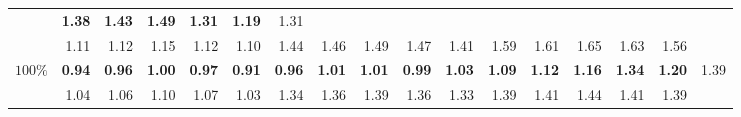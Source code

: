 \begin{table}
\begin{tabular}{|r|rrrrr|rrrrr|rrrrr|r|}
          & {\bf 1.38} & {\bf 1.43} & {\bf 1.49} & {\bf 1.31} & {\bf 1.19} & 1.31 \\
        & 1.11 & 1.12 & 1.15 & 1.12 & 1.10   & 1.44 & 1.46 & 1.49 & 1.47 & 1.41   & 1.59 & 1.61 & 1.65 & 1.63 & 1.56 & \\ \hline
      $100\%$ &
            {\bf 0.94} & {\bf 0.96} & {\bf 1.00} & {\bf 0.97} & {\bf 0.91}   
          & {\bf 0.96} & {\bf 1.01} & {\bf 1.01} & {\bf 0.99} & {\bf 1.03}   
          & {\bf 1.09} & {\bf 1.12} & {\bf 1.16} & {\bf 1.34} & {\bf 1.20} & 1.39 \\
        & 1.04 & 1.06 & 1.10 & 1.07 & 1.03   & 1.34 & 1.36 & 1.39 & 1.36 & 1.33   & 1.39 & 1.41 & 1.44 & 1.41 & 1.39 & \\ \hline
  \end{tabular}
\end{table}
